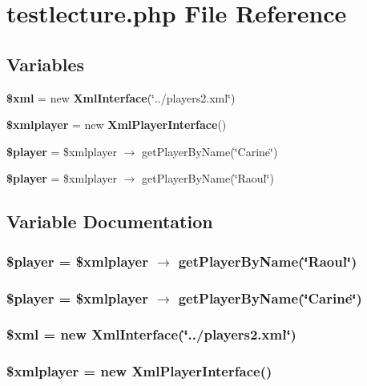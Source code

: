 \section{testlecture.php File Reference}
\label{testlecture_8php}


\subsection*{Variables}
\begin{CompactItemize}
\item 
{\bf \$xml} = new {\bf Xml\-Interface}(\char`\"{}../players2.xml\char`\"{})
\item 
{\bf \$xmlplayer} = new {\bf Xml\-Player\-Interface}()
\item 
{\bf \$player} = \$xmlplayer $\rightarrow$ get\-Player\-By\-Name(\char`\"{}Carine\char`\"{})
\item 
{\bf \$player} = \$xmlplayer $\rightarrow$ get\-Player\-By\-Name(\char`\"{}Raoul\char`\"{})
\end{CompactItemize}


\subsection{Variable Documentation}
\subsubsection{\setlength{\rightskip}{0pt plus 5cm}\$player = \$xmlplayer $\rightarrow$ get\-Player\-By\-Name(\char`\"{}Raoul\char`\"{})}\label{testlecture_8php_b3e8b8a040d140eeafa4907e25af9360}


\subsubsection{\setlength{\rightskip}{0pt plus 5cm}\$player = \$xmlplayer $\rightarrow$ get\-Player\-By\-Name(\char`\"{}Carine\char`\"{})}\label{testlecture_8php_b3e8b8a040d140eeafa4907e25af9360}


\subsubsection{\setlength{\rightskip}{0pt plus 5cm}\$xml = new {\bf Xml\-Interface}(\char`\"{}../players2.xml\char`\"{})}\label{testlecture_8php_a108d9d91e700ac530401dd363b0723b}


\subsubsection{\setlength{\rightskip}{0pt plus 5cm}\$xmlplayer = new {\bf Xml\-Player\-Interface}()}\label{testlecture_8php_84a5cd74f81647949339a8f179d5d7b1}


